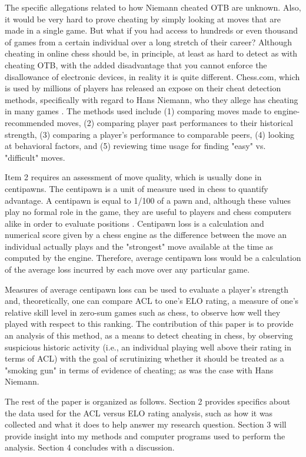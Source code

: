 \documentclass[12pt]{article}
\begin{document}
The specific allegations related to how Niemann cheated OTB are unknown. Also, it would be very hard to prove cheating by simply looking at moves that are made in a single game. But what if you had access to hundreds or even thousand of games from a certain individual over a long stretch of their career? Although cheating in online chess should be, in principle, at least as hard to detect as with cheating OTB, with the added disadvantage that you cannot enforce the disallowance of electronic devices, in reality it is quite different. Chess.com, which is used by millions of players has released an expose on their cheat detection methods, specifically with regard to Hans Niemann, who they allege has cheating in many games \citep{erikallebest2022}. The methods used include (1) comparing moves made to engine-recommended moves, (2) comparing player past performances to their historical strength, (3) comparing a player's performance to comparable peers, (4) looking at behavioral factors, and (5) reviewing time usage for finding "easy" vs. "difficult" moves.  

Item 2 requires an assessment of move quality, which is usually done in centipawns. The centipawn is a unit of measure used in chess to quantify advantage. A centipawn is equal to 1/100 of a pawn and, although these values play no formal role in the game, they are useful to players and chess computers alike in order to evaluate positions . Centipawn loss is a calculation and numerical score given by a chess engine as the difference between the move an individual actually plays and the "strongest" move available at the time as computed by the engine. Therefore, average centipawn loss would be a calculation of the average loss incurred by each move over any particular game.

Measures of average centipawn loss can be used to evaluate a player's strength and, theoretically, one can compare ACL to one's ELO rating, a measure of one's relative skill level in zero-sum games such as chess, to observe how well they played with respect to this ranking. The contribution of this paper is to provide an analysis of this method, as a means to detect cheating in chess, by observing suspicious historic activity (i.e., an individual playing well above their rating in terms of ACL) with the goal of scrutinizing whether it should be treated as a "smoking gun" in terms of evidence of cheating; as was the case with Hans Niemann.

The rest of the paper is organized as follows. Section 2 provides specifics about the data used for the ACL versus ELO rating analysis, such as how it was collected and what it does to help answer my research question. Section 3 will provide insight into my methods and computer programs used to perform the analysis. Section 4 concludes with a discussion.
\end{document}

